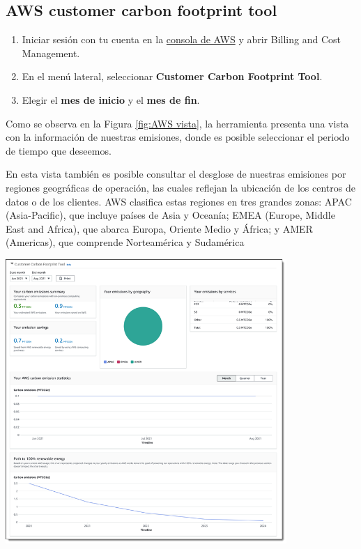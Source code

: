 \documentclass[12pt,a4paper]{report}
\begin{document}
\subsection{AWS customer carbon footprint tool}
\begin{enumerate}
  \item Iniciar sesión con tu cuenta en la \href{https://aws.amazon.com/es/console/}{consola de AWS} y abrir Billing and Cost
        Management.
  \item En el menú lateral, seleccionar \textbf{Customer Carbon Footprint Tool}.
  \item Elegir el \textbf{mes de inicio} y el \textbf{mes de fin}.
\end{enumerate}
Como se observa en la Figura \ref{fig:AWS vista}, la herramienta presenta una vista con la información de nuestras emisiones, donde es posible seleccionar el periodo de tiempo que deseemos.

En esta vista también es posible consultar el desglose de nuestras emisiones por regiones geográficas de operación, las cuales reflejan la ubicación de los centros de datos o de los clientes. AWS clasifica estas regiones en tres grandes zonas: APAC (Asia-Pacific), que incluye países de Asia y Oceanía; EMEA (Europe, Middle East and Africa), que abarca Europa, Oriente Medio y África; y AMER (Americas), que comprende Norteamérica y Sudamérica

\begin{center}
  \includegraphics[width=0.8\textwidth]{imagenes/AWS_1.png}
  \label{fig:AWS vista}
\end{center}
\end{document}
